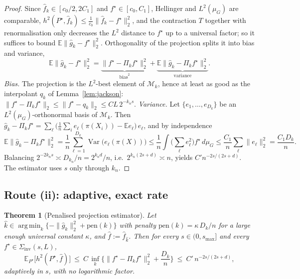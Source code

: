 \documentclass[11pt]{article}
\theoremstyle{plain}
\newtheorem{theorem}{Theorem}[section]
\theoremstyle{definition}
\theoremstyle{remark}
\newcommand{\E}{\mathbb{E}}
\DeclareMathOperator*{\argmin}{arg\,min}
\begin{document}
\begin{proof}
Since $\widehat f_k\in[c_0/2,2C_1]$ and $f^\star\in[c_0,C_1]$, Hellinger and
$L^2(\mu_G)$ are comparable, $h^2(P^\star,\widehat f_k)\le\frac1{c_0}\|\widehat
f_k-f^\star\|_2^2$, and the contraction $T$ together with renormalisation only
decreases the $L^2$ distance to $f^\star$ up to a universal factor; so it suffices
to bound $\E\|\widehat g_k-f^\star\|_2^2$. Orthogonality of the projection splits it
into bias and variance,
\[
\E\|\widehat g_k-f^\star\|_2^2
=\underbrace{\|f^\star-\Pi_kf^\star\|_2^2}_{\mathrm{bias}^2}
+\underbrace{\E\|\widehat g_k-\Pi_kf^\star\|_2^2}_{\mathrm{variance}} .
\]
\emph{Bias.} The projection is the $L^2$-best element of $\mathcal M_k$, hence at
least as good as the interpolant $q_k$ of Lemma~\ref{lem:jackson}:
$\|f^\star-\Pi_kf^\star\|_2\le\|f^\star-q_k\|_2\le CL\,2^{-k_n s}$.
\emph{Variance.} Let $\{e_1,\dots,e_{D_k}\}$ be an $L^2(\mu_G)$-orthonormal basis of
$\mathcal M_k$. Then $\widehat g_k-\Pi_kf^\star=\sum_\ell\big(\tfrac1n\sum_i
e_\ell(\pi(X_i))-\E e_\ell\big)\,e_\ell$, and by independence
\[
\E\|\widehat g_k-\Pi_kf^\star\|_2^2
=\frac1n\sum_{\ell=1}^{D_k}\operatorname{Var}\!\big(e_\ell(\pi(X))\big)
\le\frac1n\int\!\Big(\sum_{\ell}e_\ell^2\Big)f^\star\,d\mu_G
\le\frac{C_1}{n}\sum_{\ell}\|e_\ell\|_2^2=\frac{C_1D_k}{n} .
\]
Balancing $2^{-2k_n s}\asymp D_{k_n}/n=2^{k_n d}/n$, i.e.\ $2^{k_n(2s+d)}\asymp n$,
yields $C'n^{-2s/(2s+d)}$. The estimator uses $s$ only through $k_n$.
\end{proof}

\subsection{Route (ii): adaptive, exact rate}

\begin{theorem}[Penalised projection estimator]\label{thm:adaptive}
Let $\widehat k\in\argmin_k\big\{-\|\widehat g_k\|_2^2+\mathrm{pen}(k)\big\}$ with
penalty $\mathrm{pen}(k)=\kappa\,D_k/n$ for a large enough universal constant
$\kappa$, and $\widehat f:=\widehat f_{\widehat k}$. Then for every
$s\in(0,s_{\max}]$ and every $f^\star\in\Sigma_{\mathrm{inv}}(s,L)$,
\[
\E_{P^\star}\big[h^2(P^\star,\widehat f)\big]
\ \le\ C\,\inf_{k}\Big\{\|f^\star-\Pi_kf^\star\|_2^2+\frac{D_k}{n}\Big\}
\ \le\ C'\,n^{-2s/(2s+d)},
\]
\emph{adaptively in $s$}, with no logarithmic factor.
\end{theorem}
\end{document}
